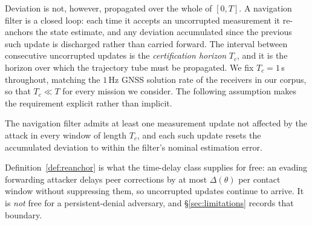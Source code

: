 Deviation is not, however, propagated over the whole of $[0,T]$. A navigation
filter is a closed loop: each time it accepts an uncorrupted measurement it
re-anchors the state estimate, and any deviation accumulated since the previous
such update is discharged rather than carried forward. The interval between
consecutive uncorrupted updates is the \emph{certification horizon} $T_c$, and
it is the horizon over which the trajectory tube must be propagated. We fix
$T_c=1$\,s throughout, matching the $1$\,Hz GNSS solution rate of the receivers
in our corpus, so that $T_c\ll T$ for every mission we consider. The following
assumption makes the requirement explicit rather than implicit.

\begin{definition}
\label{def:reanchor}
The navigation filter admits at least one measurement update not affected by the
attack in every window of length $T_c$, and each such update resets the
accumulated deviation to within the filter's nominal estimation error.
\end{definition}

Definition~\ref{def:reanchor} is what the time-delay class supplies for free: an
evading forwarding attacker delays peer corrections by at most $\Delta(\theta)$
per contact window without suppressing them, so uncorrupted updates continue to
arrive. It is \emph{not} free for a persistent-denial adversary, and
\S\ref{sec:limitations} records that boundary.

